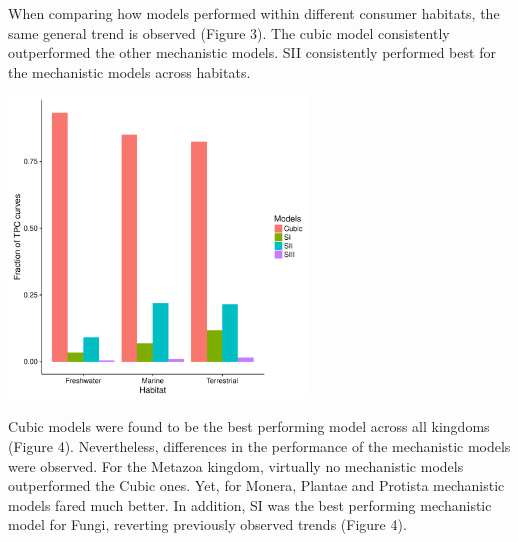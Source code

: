 \documentclass[11pt]{article}  %
\begin{document}
When comparing how models performed within different consumer habitats, the same general trend is observed (Figure 3). The cubic model consistently outperformed the other mechanistic models. SII consistently performed best for the mechanistic models across habitats.

\begin{center}
	\includegraphics[width=8cm]{Habitat_models.pdf}
\end{center}

Cubic models were found to be the best performing model across all kingdoms (Figure 4). Nevertheless, differences in the performance of the mechanistic models were observed. For the Metazoa kingdom, virtually no mechanistic models outperformed the Cubic ones. Yet, for Monera, Plantae and Protista mechanistic models fared much better. In addition, SI was the best performing mechanistic model for Fungi, reverting previously observed trends  (Figure 4).
\end{document}
